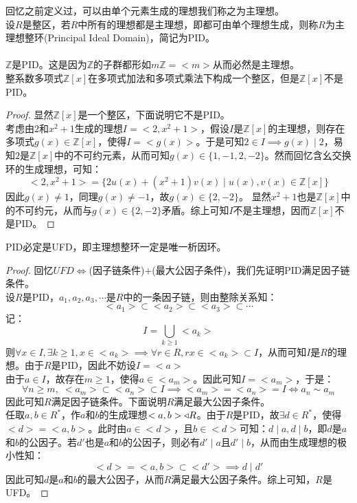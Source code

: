 \indent 回忆之前定义过，可以由单个元素生成的理想我们称之为主理想。\\
设$R$是整区，若$R$中所有的理想都是主理想，即都可由单个理想生成，则称$R$为主理想整环(Principal Ideal Domain)，简记为PID。\\
\\
$\mathbb{Z}$是PID。这是因为$\mathbb{Z}$的子群都形如$m\mathbb{Z}=<m>$从而必然是主理想。\\
整系数多项式$\mathbb{Z}[x]$在多项式加法和多项式乘法下构成一个整区，但是$\mathbb{Z}[x]$不是PID。
\begin{proof}
显然$\mathbb{Z}[x]$是一个整区，下面说明它不是PID。\\
\indent 考虑由$2$和$x^2+1$生成的理想$I=<2,x^2+1>$，假设$I$是$\mathbb{Z}[x]$的主理想，则存在多项式$g(x)\in \mathbb{Z}[x]$，使得$I=<g(x)>$。于是可知$2\in I\implies g(x)\mid 2$，易知$2$是$\mathbb{Z}[x]$中的不可约元素，从而可知$g(x)\in \{1,-1,2,-2\}$。然而回忆含幺交换环的生成理想，可知：
\[
<2,x^2+1>=\{2u(x)+(x^2+1)v(x)\mid u(x),v(x)\in \mathbb{Z}[x]\}
\]
\indent 因此$g(x)\neq 1$，同理$g(x)\neq -1$，故$g(x)\in \{2,-2\}$。 显然$x^2+1$也是$\mathbb{Z}[x]$中的不可约元，从而与$g(x)\in \{2,-2\}$矛盾。综上可知$I$不是主理想，因而$\mathbb{Z}[x]$不是PID。
\end{proof}
PID必定是UFD，即主理想整环一定是唯一析因环。
\begin{proof}
回忆$UFD\iff $(因子链条件)$+$(最大公因子条件)，我们先证明PID满足因子链条件。\\
\indent 设$R$是PID，$a_1,a_2,a_3,\cdots$是$R$中的一条因子链，则由整除关系知：
\[
<a_1>\subset<a_2>\subset<a_3>\subset\cdots
\]
记：
\[
I=\bigcup_{k\geq 1}<a_k>
\]
\indent 则$\forall x\in I,\exists k\geq 1,x\in <a_k>\implies \forall r\in R, rx\in <a_k>\subset I$，从而可知$I$是$R$的理想。由于$R$是PID，因此不妨设$I=<a>$\\
\indent 由于$a\in I$，故存在$m\geq 1$，使得$a\in <a_m>$。因此可知$I=<a_m>$，于是：
\[
\forall n\geq m,\; <a_m>\subset<a_n>\subset I\implies <a_m>=<a_n>=I\iff a_n\sim a_m
\]
因此可知$R$满足因子链条件。下面说明$R$满足最大公因子条件。\\
\indent 任取$a,b\in R^*$，作$a$和$b$的生成理想$<a,b>\triangleleft R$。由于$R$是PID，故$\exists d\in R^*$，使得$<d>=<a,b>$。此时由$a\in <d>$，且$b\in <d>$可知：$d\mid a,d\mid b$，即$d$是$a$和$b$的公因子。若$d'$也是$a$和$b$的公因子，则必有$d'\mid a$且$d'\mid b$，从而由生成理想的极小性知：
\[
<d>=<a,b>\subset<d'>\implies d\mid d'
\]
因此可知$d$是$a$和$b$的最大公因子，从而$R$满足最大公因子条件。综上可知，$R$是UFD。
\end{proof}
